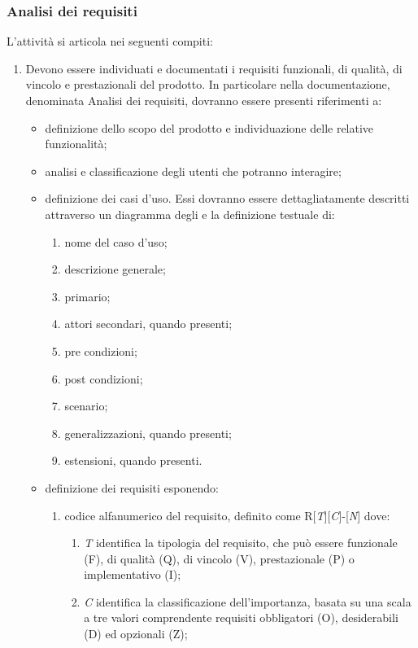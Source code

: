 \subsubsection{Analisi dei requisiti}
L'attività si articola nei seguenti compiti:
\begin{enumerate}
    \item Devono essere individuati e documentati i requisiti funzionali, di qualità, di vincolo e prestazionali del prodotto. In particolare nella documentazione, denominata Analisi dei requisiti, dovranno essere presenti riferimenti a:
    \begin{itemize}
        \item definizione dello scopo del prodotto e individuazione delle relative funzionalità;
        \item analisi e classificazione degli utenti che potranno interagire;
        \item definizione dei casi d'uso. Essi dovranno essere dettagliatamente descritti attraverso un diagramma  degli  e la definizione testuale di:
        \begin{enumerate}
            \item nome del caso d'uso;
            \item descrizione generale;
            \item {} primario;
            \item attori secondari, quando presenti;
            \item pre condizioni;
            \item post condizioni;
            \item scenario;
            \item generalizzazioni, quando presenti;
            \item estensioni, quando presenti.
        \end{enumerate}
    \item definizione dei requisiti esponendo:
    \begin{enumerate}
        \item codice alfanumerico del requisito, definito come R[\textit{T}][\textit{C}]-[\textit{N}] dove:
        \begin{enumerate}
            \item \textit{T} identifica la tipologia del requisito, che può essere funzionale (F), di qualità (Q), di vincolo (V), prestazionale (P) o implementativo (I);
            \item \textit{C} identifica la classificazione dell'importanza, basata su una scala a tre valori comprendente requisiti obbligatori (O), desiderabili (D) ed opzionali (Z);

\end{enumerate}
\end{enumerate}
\end{itemize}
\end{enumerate}
